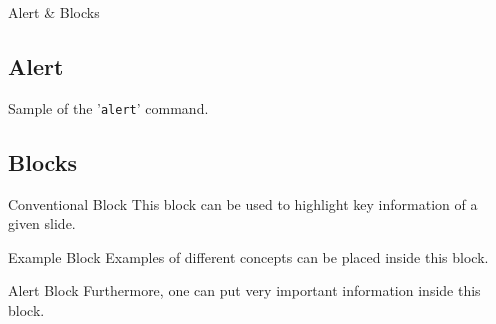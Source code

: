 \documentclass[8pt, handout, aspectratio = 1510]{beamer}
\begin{document}
	\begin{frame}{Alert \& Blocks}
		\subsection{Alert}
		\alert{Sample of the '\texttt{alert}' command.}

		\vspace{5mm}
		\subsection{Blocks}
		\begin{block}{Conventional Block}
			This block can be used to highlight key information of a given slide.
		\end{block}

		\begin{exampleblock}{Example Block}
			Examples of different concepts can be placed inside this block.
		\end{exampleblock}

		\begin{alertblock}{Alert Block}
			Furthermore, one can put very important information inside this block.
		\end{alertblock}
	\end{frame}
\end{document}
